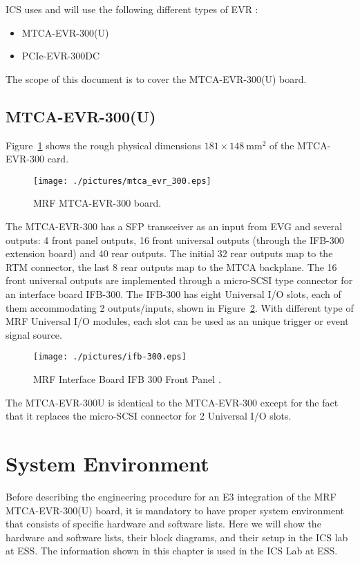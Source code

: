 \documentclass[11pt
  , a4paper
  , article
  , oneside
  , showtrims
]{memoir}
\begin{document}
ICS uses and will use the following different types of EVR :
\begin{itemize}
\item MTCA-EVR-300(U)
\item PCIe-EVR-300DC
\end{itemize}

The scope of this document is to cover the MTCA-EVR-300(U) board.


\section{MTCA-EVR-300(U)}
Figure~\ref{fig:mtca-evr300} shows the rough physical dimensions $181\times 148~\mathrm{mm}{}^2$ of the MTCA-EVR-300 card.

\begin{figure}[!htb]
  \centering
  \texttt{[image: ./pictures/mtca\_evr\_300.eps]}
  \caption{
    MRF MTCA-EVR-300 board.
  }
  \label{fig:mtca-evr300}
\end{figure}


The MTCA-EVR-300  has a SFP transceiver as an input from EVG and several outputs: 4 front panel outputs, 16 front universal outputs (through the IFB-300 extension board) and 40 rear outputs. The initial 32 rear outputs map to the RTM connector, the last 8 rear outputs map to the MTCA backplane. The 16 front universal outputs are implemented through a micro-SCSI type connector for an interface board IFB-300. The IFB-300 has eight Universal I/O slots, each of them accommodating 2 outputs/inputs, shown in Figure~\ref{fig:ifb-300}. With different type of MRF Universal I/O modules, each slot can be used as an unique trigger or event signal source.

\begin{figure}[!htb]
  \centering
  \texttt{[image: ./pictures/ifb-300.eps]}
  \caption{
    MRF Interface Board IFB 300 Front Panel \cite{MRFEVENTSYSTEMDC}.
  }
  \label{fig:ifb-300}
\end{figure}

The MTCA-EVR-300U is identical to the MTCA-EVR-300 except for the fact that it replaces the micro-SCSI connector for 2 Universal I/O slots.



\clearpage
\chapter{System Environment}
Before describing the engineering procedure for an E3 integration of the MRF MTCA-EVR-300(U) board, it is mandatory to have proper system environment that consists of specific hardware and software lists. Here we will show the hardware and software lists, their block diagrams, and their setup in the ICS lab at ESS. The information shown in this chapter is used in the ICS Lab at ESS.
\end{document}

